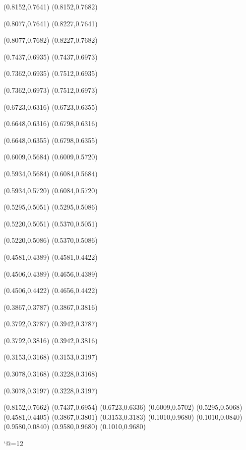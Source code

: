 \PST@Dashed(0.8152,0.7641)
(0.8152,0.7682)

\PST@Dashed(0.8077,0.7641)
(0.8227,0.7641)

\PST@Dashed(0.8077,0.7682)
(0.8227,0.7682)

\PST@Dashed(0.7437,0.6935)
(0.7437,0.6973)

\PST@Dashed(0.7362,0.6935)
(0.7512,0.6935)

\PST@Dashed(0.7362,0.6973)
(0.7512,0.6973)

\PST@Dashed(0.6723,0.6316)
(0.6723,0.6355)

\PST@Dashed(0.6648,0.6316)
(0.6798,0.6316)

\PST@Dashed(0.6648,0.6355)
(0.6798,0.6355)

\PST@Dashed(0.6009,0.5684)
(0.6009,0.5720)

\PST@Dashed(0.5934,0.5684)
(0.6084,0.5684)

\PST@Dashed(0.5934,0.5720)
(0.6084,0.5720)

\PST@Dashed(0.5295,0.5051)
(0.5295,0.5086)

\PST@Dashed(0.5220,0.5051)
(0.5370,0.5051)

\PST@Dashed(0.5220,0.5086)
(0.5370,0.5086)

\PST@Dashed(0.4581,0.4389)
(0.4581,0.4422)

\PST@Dashed(0.4506,0.4389)
(0.4656,0.4389)

\PST@Dashed(0.4506,0.4422)
(0.4656,0.4422)

\PST@Dashed(0.3867,0.3787)
(0.3867,0.3816)

\PST@Dashed(0.3792,0.3787)
(0.3942,0.3787)

\PST@Dashed(0.3792,0.3816)
(0.3942,0.3816)

\PST@Dashed(0.3153,0.3168)
(0.3153,0.3197)

\PST@Dashed(0.3078,0.3168)
(0.3228,0.3168)

\PST@Dashed(0.3078,0.3197)
(0.3228,0.3197)

\PST@Diamond(0.8152,0.7662)
\PST@Diamond(0.7437,0.6954)
\PST@Diamond(0.6723,0.6336)
\PST@Diamond(0.6009,0.5702)
\PST@Diamond(0.5295,0.5068)
\PST@Diamond(0.4581,0.4405)
\PST@Diamond(0.3867,0.3801)
\PST@Diamond(0.3153,0.3183)
\PST@Border(0.1010,0.9680)
(0.1010,0.0840)
(0.9580,0.0840)
(0.9580,0.9680)
(0.1010,0.9680)

\catcode`@=12
\fi
\endpspicture
